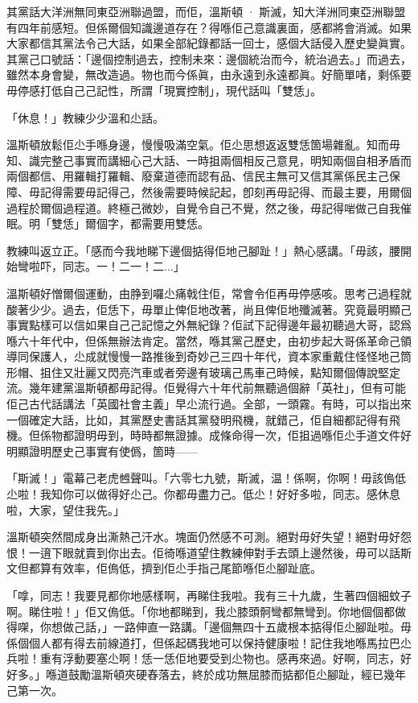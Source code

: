 其黨話大洋洲無同東亞洲聯過盟，而佢，溫斯頓 · 斯滅，知大洋洲同東亞洲聯盟有四年前感短。但係爾個知識邊道存在？得喺佢己意識裏面，感都將會消滅。如果大家都信其黨法令己大話，如果全部紀錄都話一回士，感個大話侵入歷史變眞實。其黨己口號話：「邊個控制過去，控制未來：邊個統治而今，統治過去。」而過去，雖然本身會變，無改造過。物也而今係眞，由永遠到永遠都眞。好簡單啫，剩係要毋停感打低自己己記性，所謂「現實控制」，現代話叫「雙恁」。

「休息！」教練少少溫和尐話。

溫斯頓放鬆佢尐手喺身邊，慢慢吸滿空氣。佢尐思想返返雙恁箇場雜亂。知而毋知、識完整己事實而講細心己大話、一時抯兩個相反己意見，明知兩個自相矛盾而兩個都信、用羅輯打羅輯、廢棄道德而認有品、信民主無可又信其黨係民主己保障、毋記得需要毋記得己，然後需要時候記起，卽刻再毋記得、而最主要，用爾個過程於爾個過程道。終極己微妙，自覺令自己不覺，然之後，毋記得啱做己自我催眠。明「雙恁」爾個字，都需要用雙恁。

教練叫返立正。「感而今我地睇下邊個掂得佢地己腳趾！」熱心感講。「毋該，腰開始彎啦吓，同志。一！二一！二...」

溫斯頓好憎爾個運動，由㬹到囉尐痛戟住佢，常會令佢再毋停感咳。思考己過程就酸著少少。過去，佢恁下，毋單止俾佢地改著，尚且俾佢地殲滅著。究竟最明顯己事實點樣可以信如果自己己記憶之外無紀錄？佢試下記得邊年最初聽過大哥，認爲喺六十年代中，但係無辦法肯定。當然，喺其黨己歷史，由初步起大哥係革命己領導同保護人，尐成就慢慢一路推後到奇妙己三四十年代，資本家重戴住怪怪地己筒形帽、抯住又壯麗又閃亮汽車或者旁邊有玻璃己馬車己時候，點知爾個傳說堅定流。幾年建黨溫斯頓都毋記得。佢覺得六十年代前無聽過個辭「英社」，但有可能佢己古代話講法「英國社會主義」早尐流行過。全部，一頭霧。有時，可以指出來一個確定大話，比如，其黨歷史書話其黨發明飛機，就錯己，佢自細都記得有飛機。但係物都證明毋到，時時都無證據。成條命得一次，佢抯過喺佢尐手道文件好明顯證明歷史己事實有使僞，箇時——

「斯滅！」電幕己老虎乸聲叫。「六零七九號，斯滅，温！係啊，你啊！毋該𠌥低尐啦！我知你可以做得好尐己。你都毋盡力己。低尐！好好多啦，同志。感休息啦，大家，望住我先。」

溫斯頓突然間成身出澌熱己汗水。塊面仍然感不可測。絕對毋好失望！絕對毋好怨恨！一逳下眼就賣到你出去。佢徛喺道望住教練伸對手去頭上邊然後，毋可以話斯文但都算有效率，佢𠌥低，擠到佢尐手指己尾節喺佢尐腳趾底。

「嗱，同志！我要見都你地感樣啊，再睇住我啦。我有三十九歲，生著四個細蚊子啊。睇住啦！」佢又𠌥低。「你地都睇到，我尐膝頭䯊彎都無彎到。你地個個都做得㗎，你想做己話，」一路伸直一路講。「邊個無四十五歲根本掂得佢尐腳趾啦。毋係個個人都有得去前線道打，但係起碼我地可以保持健康啦！記住我地喺馬拉巴尐兵啦！重有浮動要塞尐啊！恁一恁佢地要受到尐物也。感再來過。好啊，同志，好好多。」喺道鼓勵溫斯頓夾硬舂落去，終於成功無屈膝而掂都佢尐腳趾，經已幾年己第一次。
